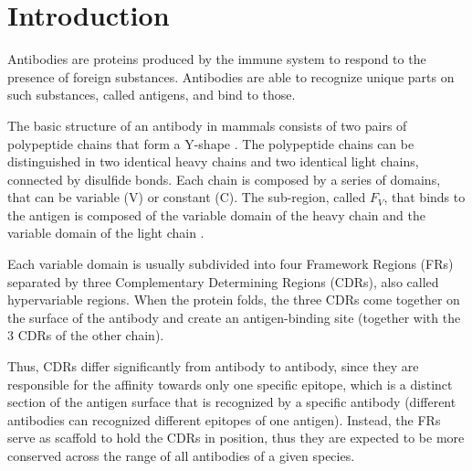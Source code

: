 \documentclass[11pt]{article}
\begin{document}





\tableofcontents
\clearpage


\section{Introduction}

Antibodies are proteins produced by the immune system to respond to the presence of foreign substances. Antibodies are able to recognize unique parts on such substances, called antigens, and bind to those. %

The basic structure of an antibody in mammals consists of two pairs of polypeptide chains that form a Y-shape \cite{encyclopedia}. The polypeptide chains can be distinguished in two identical heavy chains and two identical light chains, connected by disulfide bonds. Each chain is composed by a series of domains, that can be variable (V) or constant (C). 
The sub-region, called \textit{$F_V$}, that binds to the antigen is composed of the variable domain of the heavy chain and the variable domain of the light chain \cite{immunobiology}.

Each variable domain is usually subdivided into four Framework Regions (FRs) separated by three Complementary Determining Regions (CDRs), also called hypervariable regions. When the protein folds, the three CDRs come together on the surface of the antibody and create an antigen-binding site (together with the 3 CDRs of the other chain).

Thus, CDRs  differ significantly from antibody to antibody, since they are responsible for the affinity towards only one specific epitope, which is a distinct section of the antigen surface that is recognized by a specific antibody (different antibodies can recognized different epitopes of one antigen). 
Instead, the FRs serve as scaffold to hold the CDRs in position, thus they are expected to be more conserved across the range of all antibodies of a given species.
\end{document}
